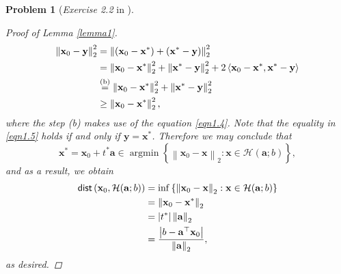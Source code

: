 \documentclass[11pt]{article}
\newtheorem{problem}{Problem}
\DeclareMathOperator*{\argmin}{argmin}
\begin{document}
\begin{problem} [\emph{Exercise 2.2} in \cite{calafiore2014optimization}]
{\begin{proof} [Proof of Lemma \ref{lemma1}]
\begin{equation}
\begin{split}
        \left\| \mathbf{x}_0 - \mathbf{y} \right\|_{2}^2 &=
        \left\| \left( \mathbf{x}_0 - \mathbf{x}^* \right) + \left( \mathbf{x}^* - \mathbf{y} \right) \right\|_{2}^2 \\
        &= \left\| \mathbf{x}_0 - \mathbf{x}^* \right\|_{2}^2 + \left\| \mathbf{x}^* - \mathbf{y} \right\|_{2}^2 + 2 \left\langle \mathbf{x}_0 - \mathbf{x}^*, \mathbf{x}^* - \mathbf{y} \right\rangle \\
        &\stackrel{\textnormal{(b)}}{=} \left\| \mathbf{x}_0 - \mathbf{x}^* \right\|_{2}^2 + \left\| \mathbf{x}^* - \mathbf{y} \right\|_{2}^2 \\
        &\geq \left\| \mathbf{x}_0 - \mathbf{x}^* \right\|_{2}^2,
    \end{split}
\end{equation}
where the step (b) makes use of the equation \eqref{eqn1.4}. Note that the equality in \eqref{eqn1.5} holds if and only if $\mathbf{y} = \mathbf{x}^*$. Therefore we may conclude that
\begin{equation*}
    \mathbf{x}^* = \mathbf{x}_0 + t^* \mathbf{a} \in \argmin \left\{ \left\| \mathbf{x}_0 - \mathbf{x} \right\|_2 : \mathbf{x} \in \mathcal{H} (\mathbf{a}; b) \right\},
\end{equation*}
and as a result, we obtain
\begin{equation*}
    \begin{split}
        \textnormal{\textsf{dist}} \left( \mathbf{x}_0, \mathcal{H} (\mathbf{a}; b) \right) &= \inf \left\{ \left\| \mathbf{x}_0 - \mathbf{x} \right\|_2 : \mathbf{x} \in \mathcal{H} (\mathbf{a}; b) \right\} \\
        &= \left\| \mathbf{x}_0 - \mathbf{x}^* \right\|_2 \\
        &= \left| t^* \right| \left\| \mathbf{a} \right\|_2 \\
        &= \frac{\left| b - \mathbf{a}^{\top} \mathbf{x}_0 \right|}{\left\| \mathbf{a} \right\|_2},
    \end{split}
\end{equation*}
as desired.

\end{proof}

}
\end{problem}
\end{document}
